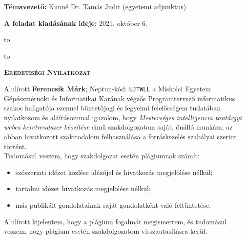     \noindent\textbf{Témavezető:} Kunné Dr. Tamás Judit (egyetemi adjunktus) \newline
    
    
    \noindent\textbf{A feladat kiadásának ideje:} 2021. október 6.\newline
    
    
    \vskip 2cm
    
    \hbox to 
    
    \hbox to 
    
    \newpage
    
    \vspace*{1cm}  
    \begin{center}
    \large\textsc{\bfseries Eredetiségi Nyilatkozat}
    \end{center}
    \vspace*{2cm}  
    
    Alulírott \textbf{Ferencsik Márk}; Neptun-kód: \texttt{UJTWLL} a Miskolci Egyetem Gépészmérnöki és Informatikai Karának végzős Programtervező informatikus szakos hallgatója ezennel büntetőjogi és fegyelmi felelősségem tudatában nyilatkozom és aláírásommal igazolom, hogy \textit{Mesterséges intelligencia tantárgyi webes keretrendszer készítése}
    című szakdolgozatom saját, önálló munkám; az abban hivatkozott szakirodalom
    felhasználása a forráskezelés szabályai szerint történt.\\
    
    Tudomásul veszem, hogy szakdolgozat esetén plágiumnak számít:
    \begin{itemize}
    \item szószerinti idézet közlése idézőjel és hivatkozás megjelölése nélkül;
    \item tartalmi idézet hivatkozás megjelölése nélkül;
    \item más publikált gondolatainak saját gondolatként való feltüntetése.
    \end{itemize}
    
    Alulírott kijelentem, hogy a plágium fogalmát megismertem, és tudomásul veszem, hogy
    plágium esetén szakdolgozatom visszautasításra kerül.
    
